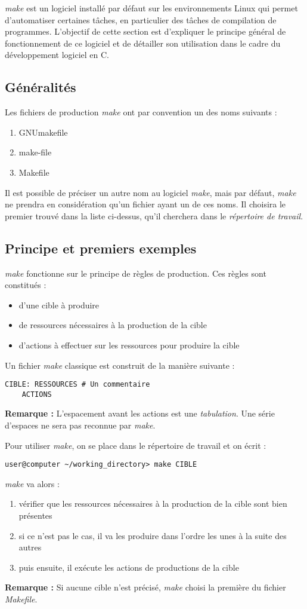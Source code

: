 \documentclass[../../../main.tex]{subfiles}
\begin{document}
\textit{make} est un logiciel installé par défaut sur les environnements Linux qui permet d'automatiser certaines tâches, en particulier des tâches de compilation de programmes. L'objectif de cette section est d'expliquer le principe général de fonctionnement de ce logiciel et de détailler son utilisation dans le cadre du développement logiciel en C.
\subsection{Généralités}
Les fichiers de production \textit{make} ont par convention un des noms suivants :
\begin{enumerate}
	\item GNUmakefile
	\item make-file
	\item Makefile
\end{enumerate}
Il est possible de préciser un autre nom au logiciel \textit{make}, mais par défaut, \textit{make} ne prendra en considération qu'un fichier ayant un de ces noms. Il choisira le premier trouvé dans la liste ci-dessus, qu'il cherchera dans le \textit{répertoire de travail}.
\subsection{Principe et premiers exemples}
\textit{make} fonctionne sur le principe de règles de production. Ces règles sont constitués :
\begin{itemize}
	\item d'une cible à produire
	\item de ressources nécessaires à la production de la cible
	\item d'actions à effectuer sur les ressources pour produire la cible
\end{itemize}
Un fichier \textit{make} classique est construit de la manière suivante :
\begin{verbatim}
CIBLE: RESSOURCES # Un commentaire
	ACTIONS
\end{verbatim}
\textbf{Remarque :} L'espacement avant les actions est une \textit{tabulation}. Une série d'espaces ne sera pas reconnue par \textit{make}.
 
Pour utiliser \textit{make}, on se place dans le répertoire de travail et on écrit :
\begin{verbatim}
user@computer ~/working_directory> make CIBLE
\end{verbatim}
\textit{make} va alors :
\begin{enumerate}
	\item vérifier que les ressources nécessaires à la production de la cible sont bien présentes
	\item si ce n'est pas le cas, il va les produire dans l'ordre les unes à la suite des autres
	\item puis ensuite, il exécute les actions de productions de la cible
\end{enumerate}
\textbf{Remarque :} Si aucune cible n'est précisé, \textit{make} choisi la première du fichier \textit{Makefile}.
 
\end{document}

